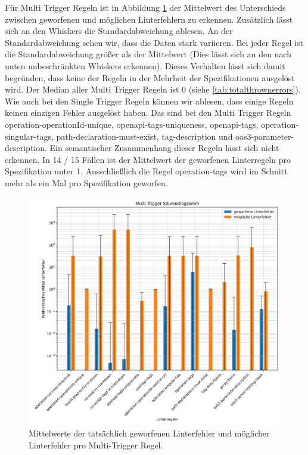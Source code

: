 Für Multi Trigger Regeln ist in Abbildung \ref{fig:multitriggerbarplot} der Mittelwert des Unterschieds zwischen geworfenen und möglichen Linterfehlern zu erkennen. Zusätzlich lässt sich an den Whiskers die Standardabweichung ablesen. An der Standardabweichung sehen wir, dass die Daten stark variieren. Bei jeder Regel ist die Standardabweichung größer als der Mittelwert (Dies lässt sich an den nach unten unbeschränkten Whiskers erkennen). Dieses Verhalten lässt sich damit begründen, dass keine der Regeln in der Mehrheit der Spezifikationen ausgelöst wird. Der Median aller Multi Trigger Regeln ist 0 (siehe \ref{tab:totalthrownerrors}). Wie auch bei den Single Trigger Regeln können wir ablesen, dass einige Regeln keinen einzigen Fehler ausgelöst haben. Das sind bei den Multi Trigger Regeln operation-operationId-unique, openapi-tags-uniqueness, openapi-tags, operation-singular-tags, path-declaration-must-exist, tag-description und oas3-parameter-description. Ein semantischer Zusammenhang dieser Regeln lässt sich nicht erkennen. In 14 / 15 Fällen ist der Mittelwert der geworfenen Linterregeln pro Spezifikation unter 1. Ausschließlich die Regel operation-tags wird im Schnitt mehr als ein Mal pro Spezifikation geworfen. 

\begin{figure}[htbp]
  \centering
  \includegraphics[width=1\linewidth]{img/multitriggerbarplot.png}
  \caption{Mittelwerte der tatsächlich geworfenen Linterfehler und möglicher Linterfehler pro Multi-Trigger Regel.}
  \label{fig:multitriggerbarplot}
\end{figure}

